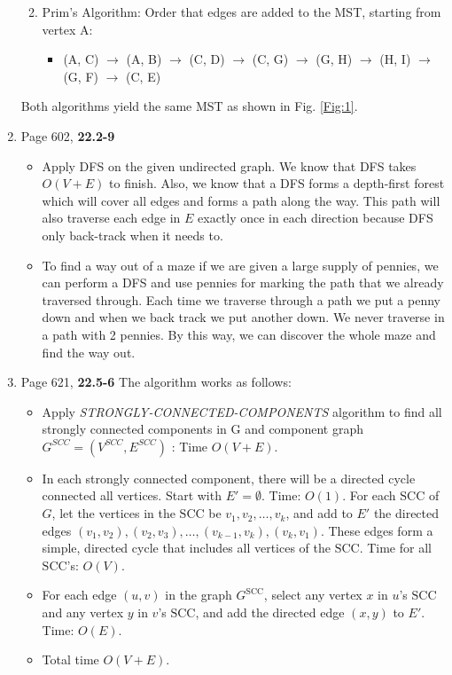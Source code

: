 \documentclass[11pts]{report}
\begin{document}
\begin{enumerate}
\begin{enumerate}
\begin{itemize}
\end{itemize}

\item Prim's Algorithm: Order that edges are added to the MST, starting from vertex A:

\begin{itemize}
\item (A, C) $\to$ (A, B) $\to$ (C, D) $\to$ (C, G) $\to$ (G, H) $\to$ (H, I) $\to$ (G, F) $\to$ (C, E)
\end{itemize}

\end{enumerate}
Both algorithms yield the same MST as shown in Fig. \ref{Fig:1}.

\item Page 602, \textbf{22.2-9}
\begin{itemize}
\item Apply DFS on the given undirected graph. We know that DFS takes $O(V + E)$ to finish. Also, we know that a DFS forms a depth-first forest which will cover all edges and forms a path along the way. This path will also  traverse each edge in $E$ exactly once in each direction because DFS only back-track when it needs to.

\item To find a way out of a maze if we are given a large supply of pennies, we can perform a DFS and use pennies for marking the path that we already traversed through. Each time we traverse through a path we put a penny down and when we back track we put another down. We never traverse in a path with 2 pennies. By this way, we can discover the whole maze and find the way out.
\end{itemize}



\item Page 621, \textbf{22.5-6}
The algorithm works as follows:
\begin{itemize}


   \item Apply \textit{STRONGLY-CONNECTED-COMPONENTS} algorithm to find all strongly connected components in G and component graph $G^{SCC} = (V^{SCC}, E^{SCC})$ : Time $O(V+E)$.
   \item In each strongly connected component, there will be a directed cycle connected all vertices. Start with $E' = \emptyset$. Time: $O(1)$. For each $\text{SCC}$ of $G$, let the vertices in the $\text{SCC}$ be $v_1, v_2, \ldots, v_k$, and add to $E'$ the directed edges $(v_1, v_2), (v_2, v_3), \ldots, (v_{k - 1}, v_k), (v_k, v_1)$. These edges form a simple, directed cycle that includes all vertices of the $\text{SCC}$. Time for all $\text{SCC}$'s: $O(V)$.
  \item   For each edge $(u, v)$ in the graph $G^{\text{SCC}}$, select any vertex $x$ in $u$'s $\text{SCC}$ and any vertex $y$ in $v$'s $\text{SCC}$, and add the directed edge $(x, y)$ to $E'$. Time: $O(E)$.
\item Total time $O(V + E)$.
\end{itemize}



\end{enumerate}
\end{document}
